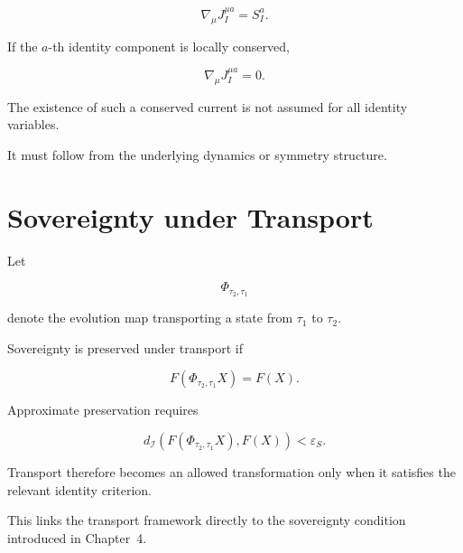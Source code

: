 \documentclass[12pt,oneside]{book}
\begin{document}
\begin{equation}
    \nabla_\mu
    J_I^{\mu a}
    =
    S_I^a.
    \label{eq:identity-current-balance}
\end{equation}

If the \(a\)-th identity component is locally conserved,

\begin{equation}
    \nabla_\mu
    J_I^{\mu a}
    =
    0.
    \label{eq:identity-current-conservation}
\end{equation}

The existence of such a conserved current is not assumed for all
identity variables.

It must follow from the underlying dynamics or symmetry
structure.


\section{Sovereignty under Transport}
\label{sec:sovereignty-transport}

Let

\begin{equation}
    \Phi_{\tau_2,\tau_1}
\end{equation}

denote the evolution map transporting a state from
\(\tau_1\) to \(\tau_2\).

Sovereignty is preserved under transport if

\begin{equation}
    F
    \left(
        \Phi_{\tau_2,\tau_1}X
    \right)
    =
    F(X).
    \label{eq:transport-sovereignty}
\end{equation}

Approximate preservation requires

\begin{equation}
    d_{\mathcal{I}}
    \left(
        F(\Phi_{\tau_2,\tau_1}X),
        F(X)
    \right)
    <
    \varepsilon_S.
    \label{eq:approximate-transport-sovereignty}
\end{equation}

Transport therefore becomes an allowed transformation only when
it satisfies the relevant identity criterion.

This links the transport framework directly to the sovereignty
condition introduced in Chapter~4.
\end{document}
